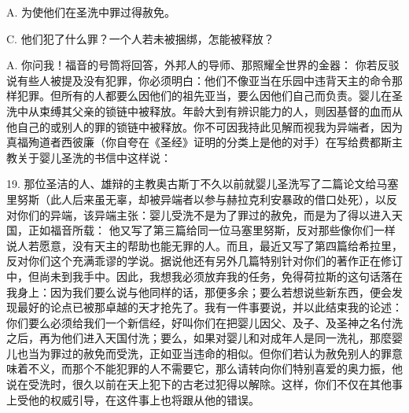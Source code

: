 A. 为使他们在圣洗中罪过得赦免。\par

C. 他们犯了什么罪？一个人若未被捆绑，怎能被释放？\par

A. 你问我！福音的号筒将回答，外邦人的导师、那照耀全世界的金器： 你若反驳说有些人被提及没有犯罪，你必须明白：他们不像亚当在乐园中违背天主的命令那样犯罪。但所有的人都要么因他们的祖先亚当，要么因他们自己而负责。婴儿在圣洗中从束缚其父亲的锁链中被释放。年龄大到有辨识能力的人，则因基督的血而从他自己的或别人的罪的锁链中被释放。你不可因我持此见解而视我为异端者，因为真福殉道者西彼廉（你自夸在《圣经》证明的分类上是他的对手）在写给费都斯主教关于婴儿圣洗的书信中这样说：\par

19. 那位圣洁的人、雄辩的主教奥古斯丁不久以前就婴儿圣洗写了二篇论文给马塞里努斯（此人后来虽无辜，却被异端者以参与赫拉克利安暴政的借口处死），以反对你们的异端，该异端主张：婴儿受洗不是为了罪过的赦免，而是为了得以进入天国，正如福音所载： 他又写了第三篇给同一位马塞里努斯，反对那些像你们一样说人若愿意，没有天主的帮助也能无罪的人。而且，最近又写了第四篇给希拉里，反对你们这个充满乖谬的学说。据说他还有另外几篇特别针对你们的著作正在修订中，但尚未到我手中。因此，我想我必须放弃我的任务，免得荷拉斯的这句话落在我身上：因为我们要么说与他同样的话，那便多余；要么若想说些新东西，便会发现最好的论点已被那卓越的天才抢先了。我有一件事要说，并以此结束我的论述：你们要么必须给我们一个新信经，好叫你们在把婴儿因父、及子、及圣神之名付洗之后，再为他们进入天国付洗；要么，如果对婴儿和对成年人是同一洗礼，那麼婴儿也当为罪过的赦免而受洗，正如亚当违命的相似。但你们若认为赦免别人的罪意味着不义，而那个不能犯罪的人不需要它，那么请转向你们特别喜爱的奥力振，他说在受洗时，很久以前在天上犯下的古老过犯得以解除。这样，你们不仅在其他事上受他的权威引导，在这件事上也将跟从他的错误。\par

